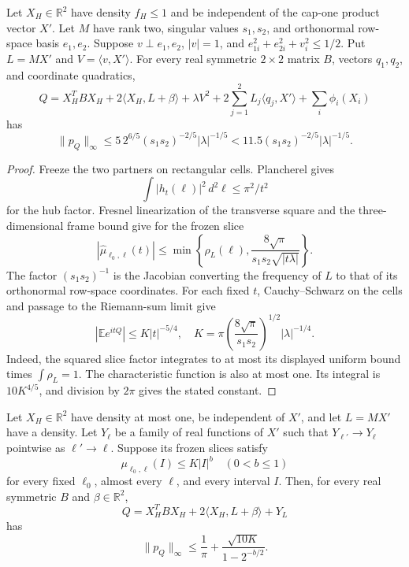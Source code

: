 \begin{theorem}\label{thm:hub-two-square}
Let $X_H\in\mathbb R^2$ have density $f_H\le1$ and be independent
of the cap-one product vector $X'$.  Let $M$ have rank two, singular
values $s_1,s_2$, and orthonormal row-space basis $e_1,e_2$.
Suppose $v\perp e_1,e_2$, $|v|=1$, and
$e_{1i}^2+e_{2i}^2+v_i^2\le1/2$.
Put $L=MX'$ and $V=\langle v,X'\rangle$.  For every real symmetric
$2\times2$ matrix $B$, vectors $q_1,q_2$, and coordinate quadratics,
\[
 Q=X_H^TBX_H+2\langle X_H,L+\beta\rangle+\lambda V^2
                   +2\sum_{j=1}^2L_j\langle q_j,X'\rangle
                   +\sum_i\phi_i(X_i)
\]
has
\[
 \|p_Q\|_\infty\le
 5\,2^{6/5}(s_1s_2)^{-2/5}|\lambda|^{-1/5}
 <11.5(s_1s_2)^{-2/5}|\lambda|^{-1/5}.
\]
\end{theorem}

\begin{proof}
Freeze the two partners on rectangular cells.  Plancherel gives
\[
 \int|h_t(\ell)|^2\,d^2\ell\le\pi^2/t^2
\]
for the hub factor.
Fresnel linearization of the transverse square and the
three-dimensional frame bound give for the frozen slice
\[
 |\widehat\mu_{\ell_0,\ell}(t)|
 \le\min\left\{\rho_L(\ell),
            \frac{8\sqrt\pi}{s_1s_2\sqrt{|t\lambda|}}\right\}.
\]
The factor $(s_1s_2)^{-1}$ is the Jacobian converting the frequency
of $L$ to that of its orthonormal row-space coordinates.
For each fixed $t$, Cauchy--Schwarz on the cells and passage to the
Riemann-sum limit give
\[
 |\mathbb E e^{itQ}|\le K|t|^{-5/4},
 \quad K=\pi\left(\frac{8\sqrt\pi}{s_1s_2}\right)^{1/2}
                              |\lambda|^{-1/4}.
\]
Indeed, the squared slice factor integrates to at most its displayed
uniform bound times $\int\rho_L=1$.
The characteristic function is also at most one.  Its integral is
$10K^{4/5}$, and division by $2\pi$ gives the stated constant.
\end{proof}

\begin{theorem}
\label{thm:hub-two-profile}
Let $X_H\in\mathbb R^2$ have density at most one, be independent of
$X'$, and let $L=MX'$ have a density.  Let $Y_\ell$ be a family of
real functions of $X'$ such that $Y_{\ell'}\to Y_\ell$ pointwise as
$\ell'\to\ell$.  Suppose its frozen slices satisfy
\[
 \mu_{\ell_0,\ell}(I)\le K|I|^b
 \quad(0<b\le1)
\]
for every fixed $\ell_0$, almost every $\ell$, and every interval $I$.
Then, for every real symmetric $B$ and $\beta\in\mathbb R^2$,
\[
 Q=X_H^TBX_H+2\langle X_H,L+\beta\rangle+Y_L
\]
has
\[
 \|p_Q\|_\infty\le\frac1\pi+
             \frac{\sqrt{10K}}{1-2^{-b/2}}.
\]
\end{theorem}

